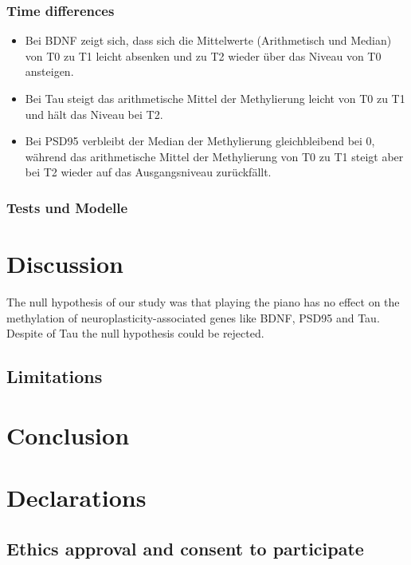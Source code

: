 \documentclass[
  letterpaper,
  DIV=11,
  numbers=noendperiod]{scrartcl}
\providecommand{\tightlist}{%
  \setlength{\itemsep}{0pt}\setlength{\parskip}{0pt}}
\begin{document}
\subsubsection{Time differences}\label{time-differences}

\begin{itemize}
\tightlist
\item
  Bei BDNF zeigt sich, dass sich die Mittelwerte (Arithmetisch und
  Median) von T0 zu T1 leicht absenken und zu T2 wieder über das Niveau
  von T0 ansteigen.
\item
  Bei Tau steigt das arithmetische Mittel der Methylierung leicht von T0
  zu T1 und hält das Niveau bei T2.
\item
  Bei PSD95 verbleibt der Median der Methylierung gleichbleibend bei 0,
  während das arithmetische Mittel der Methylierung von T0 zu T1 steigt
  aber bei T2 wieder auf das Ausgangsniveau zurückfällt.
\end{itemize}

\subsubsection{Tests und Modelle}\label{tests-und-modelle}

\section{Discussion}\label{sec-discussion}

The null hypothesis of our study was that playing the piano has no
effect on the methylation of neuroplasticity-associated genes like BDNF,
PSD95 and Tau. Despite of Tau the null hypothesis could be rejected.

\subsection{Limitations}\label{limitations}

\section{Conclusion}\label{conclusion}

\section{Declarations}\label{declarations}

\subsection{Ethics approval and consent to
participate}\label{ethics-approval-and-consent-to-participate}
\end{document}

